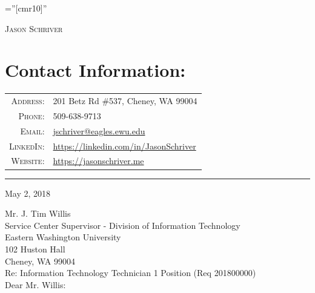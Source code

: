\documentclass[a4paper,10pt]{article}
\begin{document}

\pagestyle{empty} %

\font\fb=''[cmr10]'' %

{\begin{center}
\textsc		{\Large Jason Schriver}
\end{center}}

\section{Contact Information:}
\begin{tabular}{rl}
    \textsc{Address:}   & 201 Betz Rd \#537, Cheney, WA 99004 \\
    \textsc{Phone:}     & 509-638-9713\\
    \textsc{Email:}     & \href{mailto:jschriver@eagles.ewu.edu}{jschriver@eagles.ewu.edu}\\
    \textsc{LinkedIn:}& \href{https://linkedin.com/in/JasonSchriver}{https://linkedin.com/in/JasonSchriver}\\
	\textsc{Website:}   & \href{https://jasonschriver.me}{https://jasonschriver.me}
\end{tabular}
\hrule
May 2, 2018
\par
Mr. J. Tim Willis\\
Service Center Supervisor - Division of Information Technology\\
Eastern Washington University\\
102 Huston Hall\\
Cheney, WA 99004\\

Re: Information Technology Technician 1 Position (Req 201800000)\\

Dear Mr. Willis:\\
\end{document}
